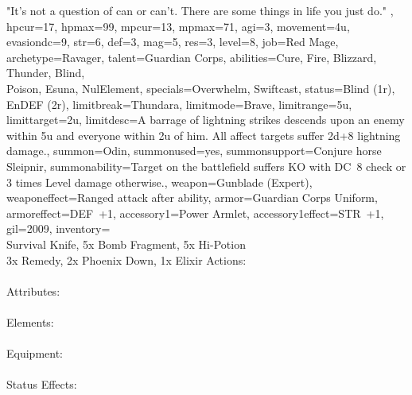 \documentclass[a4paper, titlepage, 11pt, twocolumn] {article}
\begin{document}
{{		"It's not a question of can or can't. There are some things in life you just do."
	},
	hpcur=17, hpmax=99, mpcur=13, mpmax=71, agi=3, movement=4u, evasiondc=9, str=6, def=3, mag=5, res=3, 
	level=8, job=Red Mage, archetype=Ravager, talent=Guardian Corps,
	abilities={Cure, Fire, Blizzard, Thunder, Blind,\\ Poison, Esuna, NulElement},
	specials={Overwhelm, Swiftcast}, status={Blind (1r), EnDEF (2r)},
	limitbreak=Thundara, limitmode=Brave, limitrange=5u, limittarget=2u, 
	limitdesc={A barrage of lightning strikes descends upon an enemy within 5u and everyone within 2u of him. All affect targets suffer 2d+8 lightning damage.},
	summon=Odin, summonused=yes, summonsupport={Conjure horse Sleipnir}, summonability={Target on the battlefield suffers KO with DC~8 check or 3 times Level damage otherwise.},
	weapon=Gunblade (Expert), weaponeffect=Ranged attack after ability, armor=Guardian Corps Uniform, armoreffect=DEF~+1, accessory1=Power Armlet, accessory1effect=STR~+1,
	gil=2009, inventory={\\Survival Knife, 5x Bomb Fragment, 5x Hi-Potion\\ 3x Remedy, 2x Phoenix Down, 1x Elixir}
}
\clearpage
%
Actions: \oficonattack \oficonmagic \oficontech \oficondefend \oficonitem \oficonreequip \oficondash \\\\
Attributes: \oficonhp \oficonmp \oficonstr \oficonmag \oficonres \oficonagi \\\\
Elements: \oficonfire \oficonice \oficonlightning \oficonearth \oficonwind \oficonholy \oficondark \\\\
Equipment: \oficonweapon \oficonarmor \oficonaccessory \\\\
Status Effects: \oficonko \oficonblind \oficonpoison \oficonslow \oficonsleep \oficonzombie \oficonsilence \oficonimmobile \oficondestr \oficondedef \oficondemag \oficonderes
\end{document}
